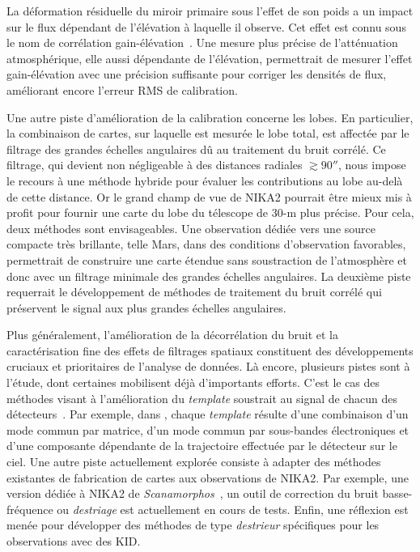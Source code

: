 La déformation résiduelle du miroir primaire sous l'effet de son poids
a un impact sur le flux dépendant de l'élévation à laquelle il
observe. Cet effet est connu sous le nom de corrélation
gain-élévation~\citep{Greve1998b}. Une mesure plus précise de
l'atténuation atmosphérique, elle aussi dépendante de l'élévation, 
permettrait de mesurer l'effet gain-élévation avec une précision
suffisante pour corriger les densités de flux, améliorant encore
l'erreur RMS de calibration.

Une autre piste d'amélioration de la calibration concerne les
lobes. En particulier, la combinaison de cartes, sur laquelle est
mesurée le lobe total, est affectée par le filtrage des grandes
échelles angulaires dû au traitement du bruit corrélé. Ce filtrage,
qui devient non négligeable à des distances radiales $\gtrsim 90''$,
nous impose le recours à une méthode hybride pour évaluer les
contributions au lobe au-delà de cette distance. Or le grand champ de
vue de NIKA2 pourrait être mieux mis à profit pour fournir une carte
du lobe du télescope de 30-m plus précise. Pour cela, deux méthodes sont
envisageables. Une observation dédiée vers une source compacte très
brillante, telle Mars, dans des conditions d'observation favorables,
permettrait de construire une carte étendue sans soustraction de
l'atmosphère et donc avec un filtrage minimale des grandes échelles
angulaires. La deuxième piste requerrait le développement de
méthodes de traitement du bruit corrélé qui préservent le signal aux
plus grandes échelles angulaires.


Plus généralement, l'amélioration de la décorrélation du bruit et la
caractérisation fine des effets de filtrages spatiaux constituent des
développements cruciaux et prioritaires de l'analyse de données. Là
encore, plusieurs pistes sont à l'étude, dont certaines mobilisent
déjà d'importants efforts. C'est le cas des méthodes visant à
l'amélioration du \emph{template} soustrait au signal de chacun des
détecteurs~\citep{Ponthieu2020}. Par exemple, dans \citet{Ruppin2019c},
chaque \emph{template} résulte d'une combinaison d'un mode commun par
matrice, d'un mode commun par sous-bandes électroniques et d'une
composante dépendante de la trajectoire effectuée par le détecteur sur
le ciel. Une autre piste actuellement explorée consiste à adapter des
méthodes existantes de fabrication de cartes aux observations de
NIKA2. Par exemple, une version dédiée à NIKA2 de
\emph{Scanamorphos}~\citep{Roussel2013, Roussel2018}, un outil de
correction du bruit basse-fréquence ou \emph{destriage} est
actuellement en cours de tests. Enfin, une réflexion est menée pour
développer des méthodes de type \emph{destrieur} spécifiques pour les
observations avec des KID.

